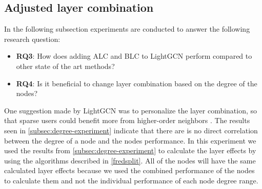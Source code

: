 \subsection{Adjusted layer combination}\label{subsec:adjusted-layer-combination}
In the following subsection experiments are conducted to answer the following research question:
\begin{itemize}
    \item \textbf{RQ3}: How does adding ALC and BLC to LightGCN perform compared to other state of the art methods?
    \item \textbf{RQ4}: Is it beneficial to change layer combination based on the degree of the nodes?
\end{itemize}
One suggestion made by LightGCN was to personalize the layer combination, so that sparse users could benefit more from higher-order neighbors \cite{lightgcn}.
The results seen in \autoref{subsec:degree-experiment} indicate that there are is no direct correlation between the degree of a node and the nodes performance.
In this experiment we used the results from \autoref{subsec:degree-experiment} to calculate the layer effects by using the algorithms described in \autoref{fredsplit}.
All of the nodes will have the same calculated layer effects because we used the combined performance of the nodes to calculate them and not the individual performance of each node degree range.

